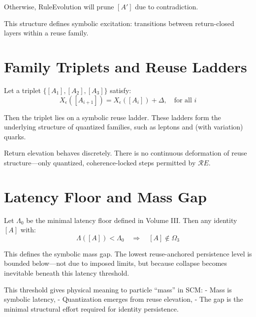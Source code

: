 Otherwise, RuleEvolution will prune $[A']$ due to contradiction.

This structure defines symbolic excitation: transitions between return-closed layers within a reuse family.

\section{Family Triplets and Reuse Ladders} \label{sec:reuse-ladders}

Let a triplet $\{[A_1], [A_2], [A_3]\}$ satisfy:
\[
X_\epsilon([A_{i+1}]) = X_\epsilon([A_i]) + \Delta,\quad \text{for all } i
\]

Then the triplet lies on a symbolic reuse ladder. These ladders form the underlying structure of quantized families, such as leptons and (with variation) quarks.

Return elevation behaves discretely. There is no continuous deformation of reuse structure—only quantized, coherence-locked steps permitted by $\mathcal{R}E$.

\section{Latency Floor and Mass Gap} \label{sec:mass-gap}

Let $\Lambda_0$ be the minimal latency floor defined in Volume III. Then any identity $[A]$ with:
\[
\Lambda([A]) < \Lambda_0
\quad \Rightarrow \quad
[A] \notin \Omega_3
\]

This defines the symbolic mass gap. The lowest reuse-anchored persistence level is bounded below—not due to imposed limits, but because collapse becomes inevitable beneath this latency threshold.

This threshold gives physical meaning to particle “mass” in SCM:
- Mass is symbolic latency,
- Quantization emerges from reuse elevation,
- The gap is the minimal structural effort required for identity persistence.

